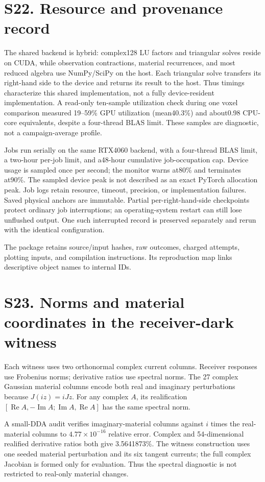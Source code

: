

\section*{S22. Resource and provenance record}
The shared backend is hybrid: complex128 LU factors and triangular solves reside on CUDA, while observation contractions, material recurrences, and most reduced algebra use NumPy/SciPy on the host. Each triangular solve transfers its right-hand side to the device and returns its result to the host. Thus timings characterize this shared implementation, not a fully device-resident implementation. A read-only ten-sample utilization check during one voxel comparison measured 19--59\% GPU utilization (mean40.3\%) and about0.98 CPU-core equivalents, despite a four-thread BLAS limit. These samples are diagnostic, not a campaign-average profile.

Jobs run serially on the same RTX4060 backend, with a four-thread BLAS limit, a two-hour per-job limit, and a48-hour cumulative job-occupation cap. Device usage is sampled once per second; the monitor warns at80\% and terminates at90\%. The sampled device peak is not described as an exact PyTorch allocation peak. Job logs retain resource, timeout, precision, or implementation failures. Saved physical anchors are immutable. Partial per-right-hand-side checkpoints protect ordinary job interruptions; an operating-system restart can still lose unflushed output. One such interrupted record is preserved separately and rerun with the identical configuration.

The package retains source/input hashes, raw outcomes, charged attempts, plotting inputs, and compilation instructions. Its reproduction map links descriptive object names to internal IDs.

\section*{S23. Norms and material coordinates in the receiver-dark witness}
Each witness uses two orthonormal complex current columns. Receiver responses use Frobenius norms; derivative ratios use spectral norms. The 27 complex Gaussian material columns encode both real and imaginary perturbations because $J(iz)=iJz$. For any complex $A$, its realification $[\operatorname{Re}A,-\operatorname{Im}A;\operatorname{Im}A,\operatorname{Re}A]$ has the same spectral norm.

A small-DDA audit verifies imaginary-material columns against $i$ times the real-material columns to $4.77\times10^{-16}$ relative error. Complex and 54-dimensional realified derivative ratios both give 3.5641873\%. The witness construction uses one seeded material perturbation and its six tangent currents; the full complex Jacobian is formed only for evaluation. Thus the spectral diagnostic is not restricted to real-only material changes.
